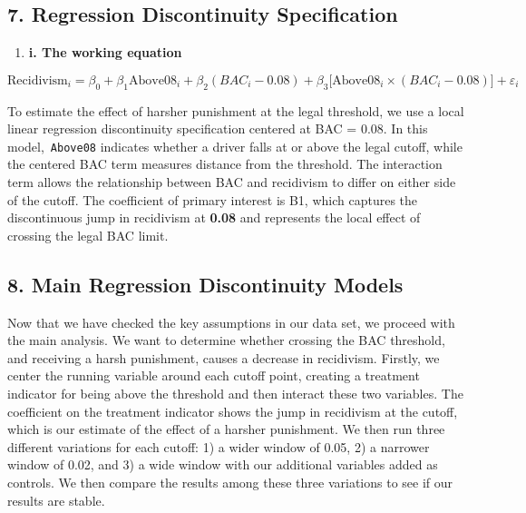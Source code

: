 \documentclass[
  letterpaper,
  DIV=11,
  numbers=noendperiod]{scrartcl}
\providecommand{\tightlist}{%
  \setlength{\itemsep}{0pt}\setlength{\parskip}{0pt}}
\begin{document}
\subsection{7. Regression Discontinuity
Specification}\label{regression-discontinuity-specification}

\begin{enumerate}
\def\labelenumi{\arabic{enumi}.}
\setcounter{enumi}{6}
\tightlist
\item
  \textbf{i. The working equation}
\end{enumerate}

\[
\text{Recidivism}_i = \beta_0 + \beta_1 \text{Above08}_i + \beta_2 (BAC_i - 0.08) + \beta_3 \big[\text{Above08}_i \times (BAC_i - 0.08)\big] + \varepsilon_i
\]

To estimate the effect of harsher punishment at the legal threshold, we
use a local linear regression discontinuity specification centered at
BAC = 0.08. In this model,~\texttt{Above08} indicates whether a driver
falls at or above the legal cutoff, while the centered BAC term measures
distance from the threshold. The interaction term allows the
relationship between BAC and recidivism to differ on either side of the
cutoff. The coefficient of primary interest is B1\hspace{0pt}, which
captures the discontinuous jump in recidivism at \textbf{0.08} and
represents the local effect of crossing the legal BAC limit.

\subsection{8. Main Regression Discontinuity
Models}\label{main-regression-discontinuity-models}

Now that we have checked the key assumptions in our data set, we proceed
with the main analysis. We want to determine whether crossing the BAC
threshold, and receiving a harsh punishment, causes a decrease in
recidivism. Firstly, we center the running variable around each cutoff
point, creating a treatment indicator for being above the threshold and
then interact these two variables. The coefficient on the treatment
indicator shows the jump in recidivism at the cutoff, which is our
estimate of the effect of a harsher punishment. We then run three
different variations for each cutoff: 1) a wider window of 0.05, 2) a
narrower window of 0.02, and 3) a wide window with our additional
variables added as controls. We then compare the results among these
three variations to see if our results are stable.
\end{document}
